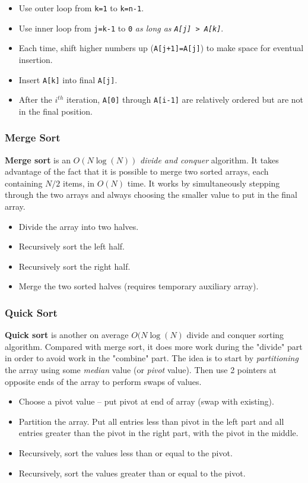 \begin{itemize}
	\item Use outer loop from \texttt{k=1} to \texttt{k=n-1}.
	\item Use inner loop from \texttt{j=k-1} to \texttt{0} \textit{as long as \texttt{A[j] > A[k]}}. 
	\item Each time, shift higher numbers up (\texttt{A[j+1]=A[j]}) to make space for eventual insertion. 
	\item Insert \texttt{A[k]} into final \texttt{A[j]}. 
	\item After the $i^{th}$ iteration, \texttt{A[0]} through \texttt{A[i-1]} are relatively ordered but are not in the final position. 
\end{itemize}

\subsubsection{Merge Sort}

\textbf{Merge sort} is an $O(N \log(N))$ \textit{divide and conquer} algorithm. It takes advantage of the fact that it is possible to merge two sorted arrays, each containing $N/2$ items, in $O(N)$ time. It works by simultaneously stepping through the two arrays and always choosing the smaller value to put in the final array. 

\begin{itemize}
	\item Divide the array into two halves.
	\item Recursively sort the left half. 
	\item Recursively sort the right half. 
	\item Merge the two sorted halves (requires temporary auxiliary array). 
\end{itemize}

\subsubsection{Quick Sort}

\textbf{Quick sort} is another on average $O(N \log(N)$ divide and conquer sorting algorithm. Compared with merge sort, it does more work during the "divide" part in order to avoid work in the "combine" part. The idea is to start by \textit{partitioning} the array using some \textit{median} value (or \textit{pivot} value). Then use 2 pointers at opposite ends of the array to perform swaps of values. 

\begin{itemize}
	\item Choose a pivot value -- put pivot at end of array (swap with existing).
	\item Partition the array. Put all entries less than pivot in the left part and all entries greater than the pivot in the right part, with the pivot in the middle. 
	\item Recursively, sort the values less than or equal to the pivot. 
	\item Recursively, sort the values greater than or equal to the pivot. 
\end{itemize}

